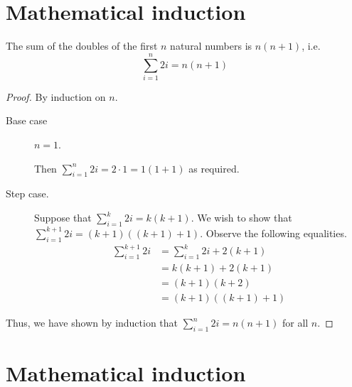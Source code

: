 \documentclass[11pt,letterpaper]{article}
\begin{document}
\section{Mathematical induction}

\begin{prop}
    The sum of the doubles of the first $n$ natural numbers is $n(n+1)$, i.e.
    \begin{equation*}
        \sum_{i=1}^n 2i = n(n+1)
    \end{equation*}
\end{prop}

\begin{proof}
    By induction on $n$.
    \begin{description}
        \item[Base case] $n=1$.

            Then $\sum_{i=1}^n 2i = 2 \cdot 1 = 1 (1 + 1)$ as required.

        \item[Step case.]

            Suppose that $\sum_{i=1}^k 2i = k(k+1)$.
            We wish to show that $\sum_{i=1}^{k+1} 2i = (k+1)((k+1)+1)$.
            Observe the following equalities.
            \begin{align*}
                \sum_{i=1}^{k+1} 2i
                &= \sum_{i=1}^k 2i + 2(k+1) \\
                &= k(k+1) + 2(k + 1) \tag{by IH} \\
                &= (k+1)(k+2) \\
                &= (k+1)((k+1)+1)
            \end{align*}
    \end{description}

    Thus, we have shown by induction that $\sum_{i=1}^n 2i = n(n+1)$ for all
    $n$.
\end{proof}

\section{Mathematical induction}
%
\newcommand{\geqs}[2]{#1 \operatorname{\mathtt{geq}} #2}
\end{document}
